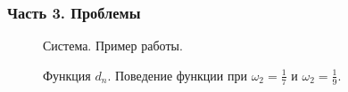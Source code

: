 \documentclass[pdf, 9pt,intlimits, unicode]{beamer}
\begin{document}
	\begin{frame}
		\frametitle{Часть 3. Проблемы}
		\begin{figure}[!hhh]
			\caption{Система. Пример работы.}
		\end{figure}
		\begin{figure}[!hhh]
			\caption{Функция $ d_n $. Поведение функции при $ \omega_2 = \frac{1}{7} $ и $ \omega_2 = \frac{1}{9} $.}
			\label{pic:diff_moment_growth_most_unique}
		\end{figure}
	\end{frame}	
	
\end{document}

